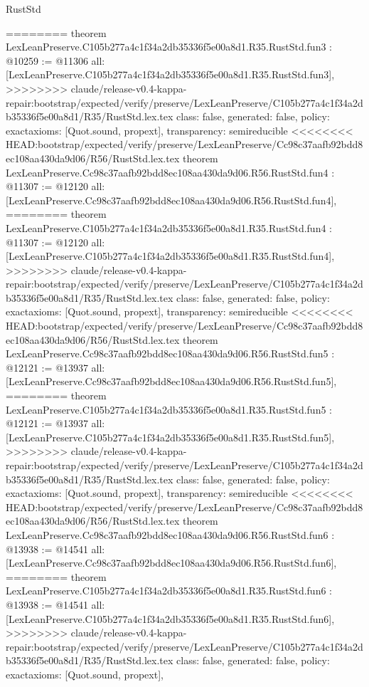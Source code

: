\begin{lexlean}{RustStd}
\begin{coremodule}
{\begin{coremodule}
{{{{{{========
theorem LexLeanPreserve.C105b277a4c1f34a2db35336f5e00a8d1.R35.RustStd.fun3 : @10259 := @11306 {
  all: [LexLeanPreserve.C105b277a4c1f34a2db35336f5e00a8d1.R35.RustStd.fun3],
>>>>>>>> claude/release-v0.4-kappa-repair:bootstrap/expected/verify/preserve/LexLeanPreserve/C105b277a4c1f34a2db35336f5e00a8d1/R35/RustStd.lex.tex
  class: false,
  generated: false,
  policy: exact{axioms: [Quot.sound, propext]},
  transparency: semireducible
}
<<<<<<<< HEAD:bootstrap/expected/verify/preserve/LexLeanPreserve/Cc98c37aafb92bdd8ec108aa430da9d06/R56/RustStd.lex.tex
theorem LexLeanPreserve.Cc98c37aafb92bdd8ec108aa430da9d06.R56.RustStd.fun4 : @11307 := @12120 {
  all: [LexLeanPreserve.Cc98c37aafb92bdd8ec108aa430da9d06.R56.RustStd.fun4],
========
theorem LexLeanPreserve.C105b277a4c1f34a2db35336f5e00a8d1.R35.RustStd.fun4 : @11307 := @12120 {
  all: [LexLeanPreserve.C105b277a4c1f34a2db35336f5e00a8d1.R35.RustStd.fun4],
>>>>>>>> claude/release-v0.4-kappa-repair:bootstrap/expected/verify/preserve/LexLeanPreserve/C105b277a4c1f34a2db35336f5e00a8d1/R35/RustStd.lex.tex
  class: false,
  generated: false,
  policy: exact{axioms: [Quot.sound, propext]},
  transparency: semireducible
}
<<<<<<<< HEAD:bootstrap/expected/verify/preserve/LexLeanPreserve/Cc98c37aafb92bdd8ec108aa430da9d06/R56/RustStd.lex.tex
theorem LexLeanPreserve.Cc98c37aafb92bdd8ec108aa430da9d06.R56.RustStd.fun5 : @12121 := @13937 {
  all: [LexLeanPreserve.Cc98c37aafb92bdd8ec108aa430da9d06.R56.RustStd.fun5],
========
theorem LexLeanPreserve.C105b277a4c1f34a2db35336f5e00a8d1.R35.RustStd.fun5 : @12121 := @13937 {
  all: [LexLeanPreserve.C105b277a4c1f34a2db35336f5e00a8d1.R35.RustStd.fun5],
>>>>>>>> claude/release-v0.4-kappa-repair:bootstrap/expected/verify/preserve/LexLeanPreserve/C105b277a4c1f34a2db35336f5e00a8d1/R35/RustStd.lex.tex
  class: false,
  generated: false,
  policy: exact{axioms: [Quot.sound, propext]},
  transparency: semireducible
}
<<<<<<<< HEAD:bootstrap/expected/verify/preserve/LexLeanPreserve/Cc98c37aafb92bdd8ec108aa430da9d06/R56/RustStd.lex.tex
theorem LexLeanPreserve.Cc98c37aafb92bdd8ec108aa430da9d06.R56.RustStd.fun6 : @13938 := @14541 {
  all: [LexLeanPreserve.Cc98c37aafb92bdd8ec108aa430da9d06.R56.RustStd.fun6],
========
theorem LexLeanPreserve.C105b277a4c1f34a2db35336f5e00a8d1.R35.RustStd.fun6 : @13938 := @14541 {
  all: [LexLeanPreserve.C105b277a4c1f34a2db35336f5e00a8d1.R35.RustStd.fun6],
>>>>>>>> claude/release-v0.4-kappa-repair:bootstrap/expected/verify/preserve/LexLeanPreserve/C105b277a4c1f34a2db35336f5e00a8d1/R35/RustStd.lex.tex
  class: false,
  generated: false,
  policy: exact{axioms: [Quot.sound, propext]},
}}}}}}}}}}
\end{coremodule}}
\end{coremodule}
\end{lexlean}
